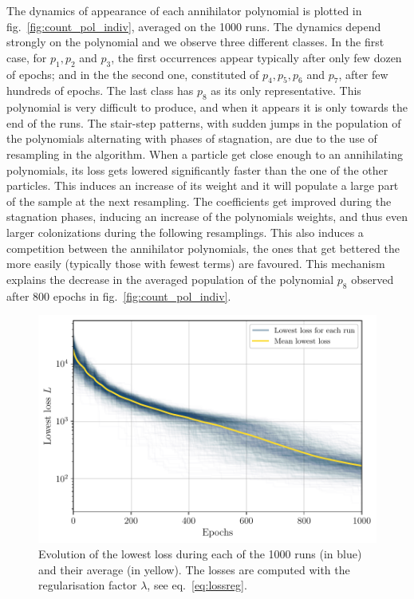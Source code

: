 \documentclass[11pt,a4paper]{article}
\begin{document}
	The dynamics of appearance of each annihilator polynomial is plotted in fig.~\ref{fig:count_pol_indiv}, averaged on the 1000 runs. The dynamics depend strongly on the polynomial and we observe three different classes. In the first case, for $p_{1}, p_{2}$ and $p_{3}$, the first occurrences appear typically after only few dozen of epochs; and in the the second one, constituted of $p_{4}, p_{5}, p_{6}$ and $p_{7}$, after few hundreds of epochs. The last class has $p_{8}$ as its only representative. This polynomial is very difficult to produce, and when it appears it is only towards the end of the runs. The stair-step patterns, with sudden jumps in the population of the polynomials alternating with phases of stagnation, are due to the use of resampling in the algorithm. When a particle get close enough to an annihilating polynomials, its loss gets lowered significantly faster than the one of the other particles. This induces an increase of its weight and it will populate a large part of the sample at the next resampling. The coefficients get improved during the stagnation phases, inducing an increase of the polynomials weights, and thus even larger colonizations during the following resamplings. This also induces a competition between the annihilator polynomials, the ones that get bettered the more easily (typically those with fewest terms) are favoured. This mechanism explains the decrease in the averaged population of the polynomial $p_{8}$ observed after 800 epochs in fig.~\ref{fig:count_pol_indiv}.

	\begin{figure}[b!]
		\centering
		\includegraphics[scale=0.75]{Figures/Loss_all_ASMC_1000runs_13.pdf}
		\caption{Evolution of the lowest loss during each of the 1000 runs (in blue) and their average (in yellow). The losses are computed with the regularisation factor $\lambda$, see eq.~\eqref{eq:lossreg}.}
		\label{fig:lossallASMC}
	\end{figure}
\end{document}
